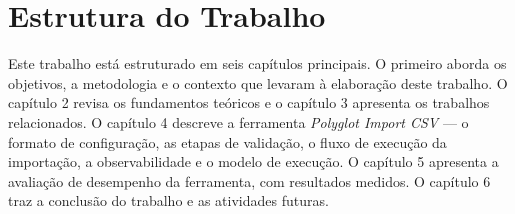 \section{Estrutura do Trabalho}

Este trabalho está estruturado em seis capítulos principais. O primeiro aborda os
objetivos, a metodologia e o contexto que levaram à elaboração deste trabalho. O capítulo 2
revisa os fundamentos teóricos e o capítulo 3 apresenta os trabalhos relacionados. O
capítulo 4 descreve a ferramenta \textit{Polyglot Import CSV} --- o formato de
configuração, as etapas de validação, o fluxo de execução da importação, a observabilidade
e o modelo de execução. O capítulo 5 apresenta a avaliação de desempenho da ferramenta,
com resultados medidos. O
capítulo 6 traz a conclusão do trabalho e as atividades futuras.
